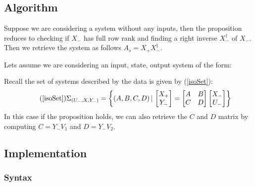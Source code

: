 \subsection{Algorithm}

Suppose we are considering a system without any inputs, then the proposition reduces to checking if $X_-$ has full row rank and finding a right inverse $X_-^\dagger$ of $X_-$. Then we retrieve the system as follows $A_s = X_+ X_-^\dagger$.

Lets assume we are considering an input, state, output system of the form:

Recall the set of systems described by the data is given by (\ref{isoSet}):
\begin{equation*} \tag{\ref{isoSet}}
\Sigma_{(U_-,X, Y_-)} = \left\{ (A, B, C, D) \, | \, 
\begin{bmatrix} X_{+} \\ Y_{-} \end{bmatrix} = 
\begin{bmatrix} A & B \\ C & D \end{bmatrix} 
\begin{bmatrix} X_{-} \\ U_{-} \end{bmatrix} \right\} 
\end{equation*}
In this case if the proposition holds, we can also retrieve the $C$ and $D$ matrix by computing $C = Y_- V_1$ and $D = Y_- V_2$.

\subsection{Implementation}
\subsubsection*{Syntax}
 \\
 \\

